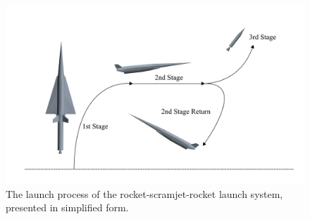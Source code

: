 \begin{figure}[ht]
	\centering
	\includegraphics[width=0.9\linewidth]{figures/3_vehicle_design/Trajsimple}
	\caption{The launch process of the rocket-scramjet-rocket launch system, presented in simplified form.}
	\label{fig:Trajsimple}
\end{figure}

